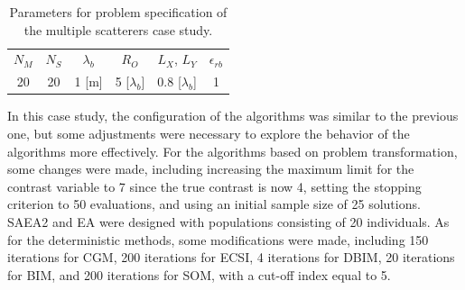 			\begin{table}[!h]
				\centering
				\caption[Parameters for the multiple scatterers case study.]{Parameters for problem specification of the multiple scatterers case study.}
				\begin{tabular}{cccccc}
					$N_M$ & $N_S$ & $\lambda_b$ & $R_O$ & $L_X$, $L_Y$ & $\epsilon_{rb}$ \\
					20 & 20 & 1 [m] & 5 [$\lambda_b$] & 0.8 [$\lambda_b$] & 1
				\end{tabular}
				\label{tab:results:casestudy:multiple:configuration}
			\end{table}
			
			
			In this case study, the configuration of the algorithms was similar to the previous one, but some adjustments were necessary to explore the behavior of the algorithms more effectively. For the algorithms based on problem transformation, some changes were made, including increasing the maximum limit for the contrast variable to 7 since the true contrast is now 4, setting the stopping criterion to 50 evaluations, and using an initial sample size of 25 solutions. SAEA2 and EA were designed with populations consisting of 20 individuals. As for the deterministic methods, some modifications were made, including 150 iterations for CGM, 200 iterations for ECSI, 4 iterations for DBIM, 20 iterations for BIM, and 200 iterations for SOM, with a cut-off index equal to 5.

